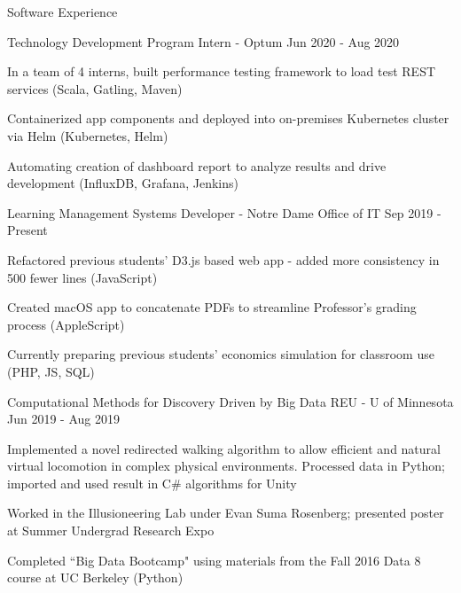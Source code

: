 \documentclass[10pt]{resume} %
\begin{document}
\begin{rSection}{ Software Experience }

\begin{rSubsection}{ Technology Development Program Intern - Optum }{ Jun 2020 - Aug 2020 }{}{}
\item In a team of 4 interns, built performance testing framework to load test REST services (Scala, Gatling, Maven)
\item Containerized app components and deployed into on-premises Kubernetes cluster via Helm (Kubernetes, Helm)
\item Automating creation of dashboard report to analyze results and drive development (InfluxDB, Grafana, Jenkins)
\end{rSubsection}

\begin{rSubsection}{ Learning Management Systems Developer - Notre Dame Office of IT }{ Sep 2019 - Present }{}{}
\item Refactored previous students' D3.js based web app - added more consistency in 500 fewer lines (JavaScript)
\item Created macOS app to concatenate PDFs to streamline Professor's grading process (AppleScript)
\item Currently preparing previous students' economics simulation for classroom use (PHP, JS, SQL)
\end{rSubsection}

\begin{rSubsection}{ Computational Methods for Discovery Driven by Big Data REU - U of Minnesota}{ Jun 2019 - Aug 2019 }{}{}
\item Implemented a novel redirected walking algorithm to allow efficient and natural virtual locomotion in complex physical environments. Processed data in Python; imported and used result in C\# algorithms for Unity
\item Worked in the Illusioneering Lab under Evan Suma Rosenberg; presented poster at Summer Undergrad Research Expo%
\item Completed ``Big Data Bootcamp" using materials from the Fall 2016 Data 8 course at UC Berkeley (Python)
\end{rSubsection}


\end{rSection}
\end{document}
